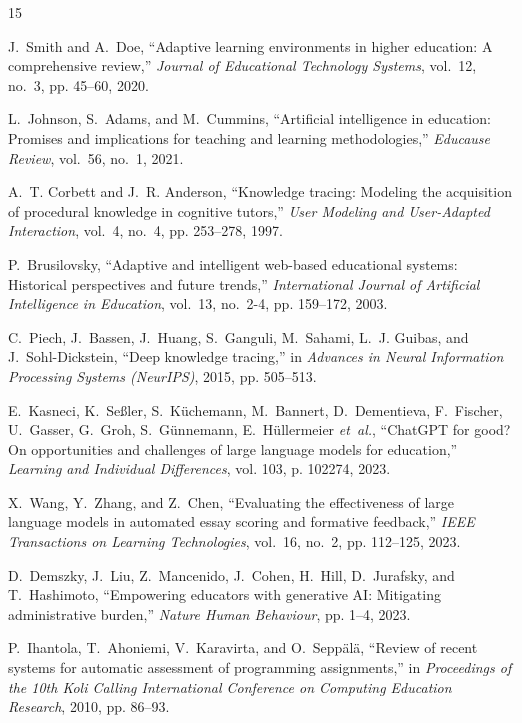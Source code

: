 \documentclass[conference]{IEEEtran}
\begin{document}

\begin{thebibliography}{15}

J.~Smith and A.~Doe, ``Adaptive learning environments in higher education: A comprehensive review,'' \emph{Journal of Educational Technology Systems}, vol.~12, no.~3, pp. 45--60, 2020.

L.~Johnson, S.~Adams, and M.~Cummins, ``Artificial intelligence in education: Promises and implications for teaching and learning methodologies,'' \emph{Educause Review}, vol.~56, no.~1, 2021.

A.~T. Corbett and J.~R. Anderson, ``Knowledge tracing: Modeling the acquisition of procedural knowledge in cognitive tutors,'' \emph{User Modeling and User-Adapted Interaction}, vol.~4, no.~4, pp. 253--278, 1997.

P.~Brusilovsky, ``Adaptive and intelligent web-based educational systems: Historical perspectives and future trends,'' \emph{International Journal of Artificial Intelligence in Education}, vol.~13, no.~2-4, pp. 159--172, 2003.

C.~Piech, J.~Bassen, J.~Huang, S.~Ganguli, M.~Sahami, L.~J. Guibas, and J.~Sohl-Dickstein, ``Deep knowledge tracing,'' in \emph{Advances in Neural Information Processing Systems (NeurIPS)}, 2015, pp. 505--513.

E.~Kasneci, K.~Se{\ss}ler, S.~K{\"u}chemann, M.~Bannert, D.~Dementieva, F.~Fischer, U.~Gasser, G.~Groh, S.~G{\"u}nnemann, E.~H{\"u}llermeier \emph{et~al.}, ``ChatGPT for good? On opportunities and challenges of large language models for education,'' \emph{Learning and Individual Differences}, vol. 103, p. 102274, 2023.

X.~Wang, Y.~Zhang, and Z.~Chen, ``Evaluating the effectiveness of large language models in automated essay scoring and formative feedback,'' \emph{IEEE Transactions on Learning Technologies}, vol.~16, no.~2, pp. 112--125, 2023.

D.~Demszky, J.~Liu, Z.~Mancenido, J.~Cohen, H.~Hill, D.~Jurafsky, and T.~Hashimoto, ``Empowering educators with generative AI: Mitigating administrative burden,'' \emph{Nature Human Behaviour}, pp. 1--4, 2023.

P.~Ihantola, T.~Ahoniemi, V.~Karavirta, and O.~Sepp{\"a}l{\"a}, ``Review of recent systems for automatic assessment of programming assignments,'' in \emph{Proceedings of the 10th Koli Calling International Conference on Computing Education Research}, 2010, pp. 86--93.


\end{thebibliography}
\end{document}
